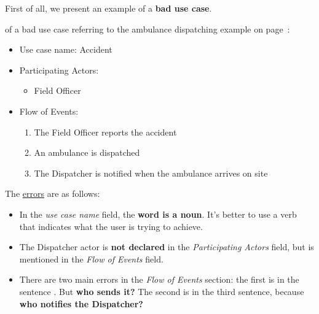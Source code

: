 \noindent
First of all, we present an example of a \textbf{bad use case}.
\begin{examplebox}
     of a bad use case referring to the ambulance dispatching example on page~\pageref{example: ambulance dispatching system}:
    \begin{itemize}
        \item Use case name: Accident
        \item Participating Actors:
        \begin{itemize}
            \item Field Officer
        \end{itemize}
        \item Flow of Events:
        \begin{enumerate}
            \item The Field Officer reports the accident
            \item An ambulance is dispatched
            \item The Dispatcher is notified when the ambulance arrives on site
        \end{enumerate}
    \end{itemize}
    The \underline{errors} are as follows:
    \begin{itemize}
        \item In the \emph{use case name} field, the \textbf{word is a noun}. It's better to use a verb that indicates what the user is trying to achieve.
        
        \item The Dispatcher actor is \textbf{not declared} in the \emph{Participating Actors} field, but is mentioned in the \emph{Flow of Events} field.

        \item There are two main errors in the \emph{Flow of Events} section: the first is in the sentence . But \textbf{who sends it?} The second is in the third sentence, because \textbf{who notifies the Dispatcher?}
    \end{itemize}
\end{examplebox}